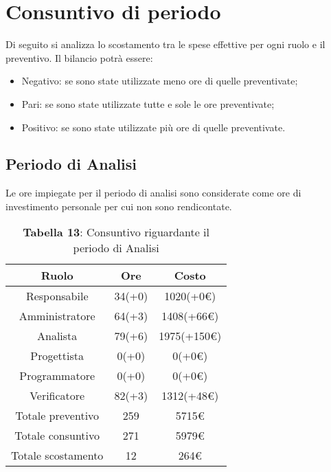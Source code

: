 \section{Consuntivo di periodo}
Di seguito si analizza lo scostamento tra le spese effettive per ogni ruolo e il preventivo. Il bilancio potrà essere:
\begin{itemize}
	\item Negativo: se sono state utilizzate meno ore di quelle preventivate;
	\item Pari: se sono state utilizzate tutte e sole le ore preventivate;
	\item Positivo: se sono state utilizzate più ore di quelle preventivate.
\end{itemize}
\subsection{Periodo di Analisi}
Le ore impiegate per il periodo di analisi sono considerate come ore di investimento personale per cui non sono rendicontate.
\begin{table}[H]
	\centering
	\renewcommand{\arraystretch}{1.5}
	\begin{tabular}{|c|c|c|}
		\hline
		\rowcolor{lighter-grayer}
Ruolo & Ore & Costo \\ \hline
Responsabile & 34(+0) & 1020(+0\euro) \\ \hline
Amministratore & 64(+3) & 1408(+66\euro) \\ \hline
Analista & 79(+6) & 1975(+150\euro) \\ \hline
Progettista & 0(+0) & 0(+0\euro) \\ \hline
Programmatore & 0(+0) & 0(+0\euro) \\ \hline
Verificatore & 82(+3) & 1312(+48\euro) \\ \hline
Totale preventivo & 259 & 5715\euro \\ \hline
Totale consuntivo & 271 & 5979\euro \\ \hline
Totale scostamento & 12 & 264\euro \\ \hline
	\end{tabular}
	\caption*{\textbf{Tabella 13}: Consuntivo riguardante il periodo di Analisi\\}
\end{table}
